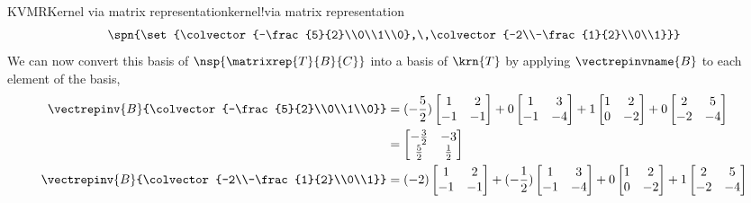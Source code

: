\begin{example}{KVMR}{Kernel via matrix representation}{kernel!via matrix representation}
\begin{equation*}
\spn{\set{\colvector{-\frac{5}{2}\\0\\1\\0},\,\colvector{-2\\-\frac{1}{2}\\0\\1}}}
\end{equation*}
%
We can  now convert this basis of $\nsp{\matrixrep{T}{B}{C}}$ into a basis of $\krn{T}$ by applying $\vectrepinvname{B}$ to each element of the basis,
%
\begin{align*}
\vectrepinv{B}{\colvector{-\frac{5}{2}\\0\\1\\0}}&=
(-\frac{5}{2})\begin{bmatrix}1 & 2 \\ -1 & -1\end{bmatrix}+
0\begin{bmatrix}1 & 3 \\ -1 & -4\end{bmatrix}+
1\begin{bmatrix}1 & 2 \\ 0 & -2\end{bmatrix}+
0\begin{bmatrix}2 & 5 \\ -2 & -4\end{bmatrix}\\
&=\begin{bmatrix}-\frac{3}{2} & -3 \\ \frac{5}{2} & \frac{1}{2}\end{bmatrix}\\
%
\vectrepinv{B}{\colvector{-2\\-\frac{1}{2}\\0\\1}}&=
(-2)\begin{bmatrix}1 & 2 \\ -1 & -1\end{bmatrix}+
(-\frac{1}{2})\begin{bmatrix}1 & 3 \\ -1 & -4\end{bmatrix}+
0\begin{bmatrix}1 & 2 \\ 0 & -2\end{bmatrix}+
1\begin{bmatrix}2 & 5 \\ -2 & -4\end{bmatrix}\\

\end{align*}
\end{example}
